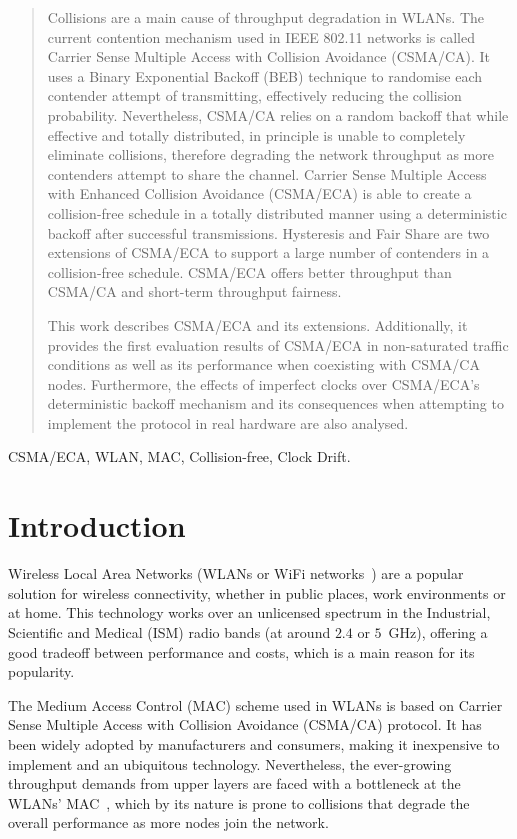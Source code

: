 \documentclass[a4paper,journal]{IEEEtran}
\begin{document}
\begin{abstract}

\boldmath Collisions are a main cause of throughput degradation in WLANs. The current contention mechanism used in IEEE 802.11 networks is called Carrier Sense Multiple Access with Collision Avoidance (CSMA/CA). It uses a Binary Exponential Backoff (BEB) technique to randomise each contender attempt of transmitting, effectively reducing the collision probability. Nevertheless, CSMA/CA relies on a random backoff that while effective and totally distributed, in principle is unable to completely eliminate collisions, therefore degrading the network throughput as more contenders attempt to share the channel. Carrier Sense Multiple Access with Enhanced Collision Avoidance (CSMA/ECA) is able to create a collision-free schedule in a totally distributed manner using a deterministic backoff after successful transmissions. Hysteresis and Fair Share are two extensions of CSMA/ECA to support a large number of contenders in a collision-free schedule. CSMA/ECA offers better throughput than CSMA/CA and short-term throughput fairness.

This work describes CSMA/ECA and its extensions. Additionally, it provides the first evaluation results of CSMA/ECA in non-saturated traffic conditions as well as its performance when coexisting with CSMA/CA nodes. Furthermore, the effects of imperfect clocks over CSMA/ECA's deterministic backoff mechanism and its consequences when attempting to implement the protocol in real hardware are also analysed.

\end{abstract}

\begin{IEEEkeywords}
CSMA/ECA, WLAN, MAC, Collision-free, Clock Drift.
\end{IEEEkeywords}

\section{Introduction}\label{introduction}
Wireless Local Area Networks (WLANs or WiFi networks~\cite{802Standards}) are a popular solution for wireless connectivity, whether in public places, work environments or at home. This technology works over an unlicensed spectrum in the Industrial, Scientific and Medical (ISM) radio bands (at around $2.4$ or $5$~GHz), offering a good tradeoff between performance and costs, which is a main reason for its popularity. 

The Medium Access Control (MAC) scheme used in WLANs is based on Carrier Sense Multiple Access with Collision Avoidance (CSMA/CA) protocol. It has been widely adopted by manufacturers and consumers, making it inexpensive to implement and an ubiquitous technology. Nevertheless, the ever-growing throughput demands from upper layers are faced with a bottleneck at the WLANs' MAC~\cite{perahia2008ieee}, which by its nature is prone to collisions that degrade the overall performance as more nodes join the network.
\end{document}
